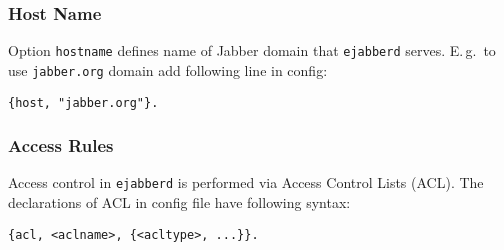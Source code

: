 \documentclass[10pt]{article}
\newcommand{\ejabberd}{\texttt{ejabberd}}
\newcommand{\Jabber}{Jabber}
\begin{document}
\subsubsection{Host Name}
\label{sec:confighostname}

Option \texttt{hostname} defines name of \Jabber{} domain that \ejabberd{}
serves.  E.\,g.\ to use \texttt{jabber.org} domain add following line in config:
\begin{verbatim}
{host, "jabber.org"}.
\end{verbatim}




\subsubsection{Access Rules}
\label{sec:configaccess}

Access control in \ejabberd{} is performed via Access Control Lists (ACL).  The
declarations of ACL in config file have following syntax:
\begin{verbatim}
{acl, <aclname>, {<acltype>, ...}}.
\end{verbatim}
\end{document}
